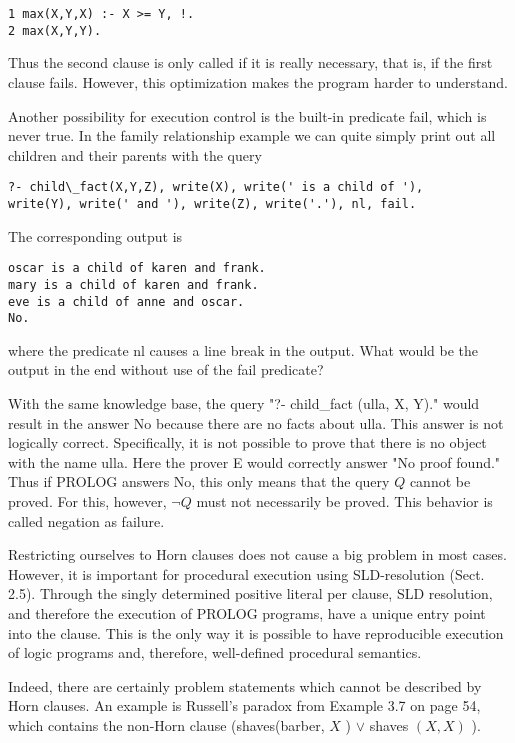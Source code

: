 \documentclass[10pt]{article}
\begin{document}
\begin{verbatim}
1 max(X,Y,X) :- X >= Y, !.
2 max(X,Y,Y).
\end{verbatim}

Thus the second clause is only called if it is really necessary, that is, if the first clause fails. However, this optimization makes the program harder to understand.

Another possibility for execution control is the built-in predicate fail, which is never true. In the family relationship example we can quite simply print out all children and their parents with the query

\begin{verbatim}
?- child\_fact(X,Y,Z), write(X), write(' is a child of '),
write(Y), write(' and '), write(Z), write('.'), nl, fail.
\end{verbatim}

The corresponding output is

\begin{verbatim}
oscar is a child of karen and frank.
mary is a child of karen and frank.
eve is a child of anne and oscar.
No.
\end{verbatim}

where the predicate nl causes a line break in the output. What would be the output in the end without use of the fail predicate?

With the same knowledge base, the query "?- child\_fact (ulla, X, Y)." would result in the answer No because there are no facts about ulla. This answer is not logically correct. Specifically, it is not possible to prove that there is no object with the name ulla. Here the prover E would correctly answer "No proof found." Thus if PROLOG answers No, this only means that the query $Q$ cannot be proved. For this, however, $\neg Q$ must not necessarily be proved. This behavior is called negation as failure.

Restricting ourselves to Horn clauses does not cause a big problem in most cases. However, it is important for procedural execution using SLD-resolution (Sect. 2.5). Through the singly determined positive literal per clause, SLD resolution, and therefore the execution of PROLOG programs, have a unique entry point into the clause. This is the only way it is possible to have reproducible execution of logic programs and, therefore, well-defined procedural semantics.

Indeed, there are certainly problem statements which cannot be described by Horn clauses. An example is Russell's paradox from Example 3.7 on page 54, which contains the non-Horn clause (shaves(barber, $X$ ) $\vee$ shaves $(X, X)$ ).
\end{document}
